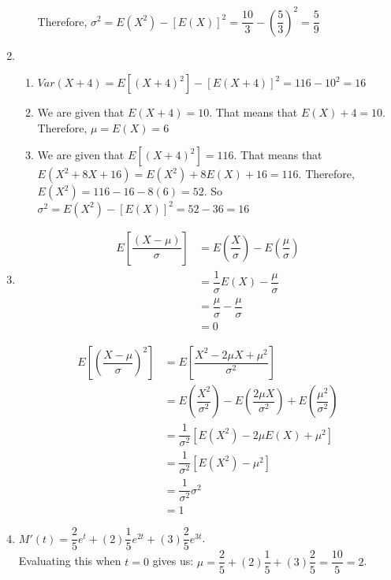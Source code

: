 \documentclass{article}
\begin{document}
\begin{enumerate}
\begin{enumerate}
	  Therefore, $\sigma^2 = E(X^2) - [E(X)]^2 = \dfrac{10}{3} - \left(\dfrac{5}{3}\right)^2
	      = \dfrac{5}{9}$

	\end{enumerate}
      
      \addtocounter{enumi}{1}

      \item
	\begin{enumerate}
	 \item 
	  $Var(X+4) = E[(X+4)^2] - [E(X+4)]^2 = 116 - 10^2 = 16$
	  
	 \item
	  We are given that $E(X+4) = 10$. That means that $E(X) + 4 = 10$. Therefore, $\mu = E(X) = 6$
	  
	 \item
	  We are given that $E[(X+4)^2] = 116$. That means that $E(X^2 + 8X + 16) = E(X^2) + 8E(X) + 16
	    = 116$. Therefore, $E(X^2) = 116 - 16 - 8(6) = 52$. So $\sigma^2 = E(X^2) - [E(X)]^2 =
	    52 - 36 = 16$
	\end{enumerate}
	
      \item
	\begin{align*}
	 E\left[\dfrac{(X - \mu)}{\sigma}\right] &= E\left(\dfrac{X}{\sigma}\right) 
	      - E\left(\dfrac{\mu}{\sigma}\right) \\
	    &= \dfrac{1}{\sigma}E(X) - \dfrac{\mu}{\sigma} \\
	    &= \dfrac{\mu}{\sigma} - \dfrac{\mu}{\sigma} \\
	    &= 0
	\end{align*}
	
	\begin{align*}
	 E\left[\left(\dfrac{X-\mu}{\sigma}\right)^2\right] &= E\left[\dfrac{X^2-2\mu X + \mu^2}{\sigma^2}\right] \\
	    &= E\left(\dfrac{X^2}{\sigma^2}\right) - E\left(\dfrac{2\mu X}{\sigma^2}\right) +
		E\left(\dfrac{\mu^2}{\sigma^2}\right) \\
	    &= \dfrac{1}{\sigma^2}[E(X^2) - 2\mu E(X) + \mu^2] \\
	    &= \dfrac{1}{\sigma^2}[E(X^2) - \mu^2] \\
	    &= \dfrac{1}{\sigma^2}\sigma^2 \\
	    &= 1
	\end{align*}
      \addtocounter{enumi}{6}

      \item
	$M'(t) = \dfrac{2}{5}e^t + (2)\dfrac{1}{5}e^{2t} + (3)\dfrac{2}{5}e^{3t}$. \\ 
	Evaluating this when $t = 0$ gives us: $\mu = \dfrac{2}{5} + (2)\dfrac{1}{5} + (3)\dfrac{2}{5} 
	    = \dfrac{10}{5} = 2$.
	

\end{enumerate}
\end{document}

